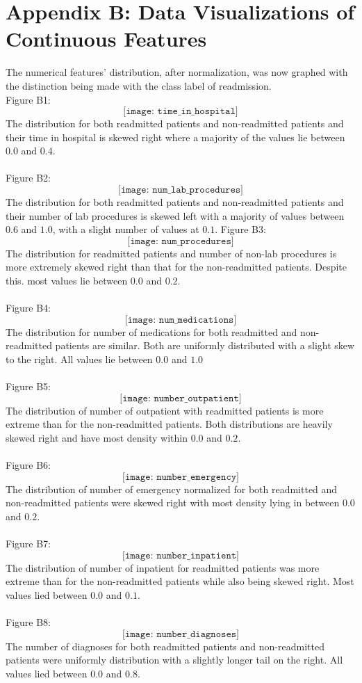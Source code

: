 \documentclass{article}
\begin{document}
\section{Appendix B: Data Visualizations of Continuous Features}
The numerical features' distribution, after normalization, was now graphed with the distinction being made with the class label of readmission. \\
Figure B1: $$ \texttt{[image: time\_in\_hospital]}$$ 
The distribution for both readmitted patients and non-readmitted patients and their time in hospital is skewed right where a majority of the values lie between $0.0$ and $0.4$. \\~\\
Figure B2: $$ \texttt{[image: num\_lab\_procedures]}$$ 
The distribution for both readmitted patients and non-readmitted patients and their number of lab procedures is skewed left with a majority of values between $0.6$ and $1.0$, with a slight number of values at $0.1$. \newpage
Figure B3: $$ \texttt{[image: num\_procedures]}$$ 
The distribution for readmitted patients and number of non-lab procedures is more extremely skewed right than that for the non-readmitted patients. Despite this. most values lie between $0.0$ and $0.2$. \\~\\
Figure B4: $$ \texttt{[image: num\_medications]}$$ 
The distribution for number of medications for both readmitted and non-readmitted patients are similar. Both are uniformly distributed with a slight skew to the right. All values lie between $0.0$ and $1.0$ \\~\\
Figure B5: $$ \texttt{[image: number\_outpatient]}$$ 
The distribution of number of outpatient with readmitted patients is more extreme than for the non-readmitted patients. Both distributions are heavily skewed right and have most density within $0.0$ and $0.2$. \\~\\
Figure B6: $$ \texttt{[image: number\_emergency]}$$ 
The distribution of number of emergency normalized for both readmitted and non-readmitted patients were skewed right with most density lying in between $0.0$ and $0.2$. \\~\\
Figure B7: $$ \texttt{[image: number\_inpatient]}$$ 
The distribution of number of inpatient for readmitted patients was more extreme than for the non-readmitted patients while also being skewed right. Most values lied between $0.0$ and $0.1$. \\~\\
Figure B8: $$ \texttt{[image: number\_diagnoses]}$$ 
The number of diagnoses for both readmitted patients and non-readmitted patients were uniformly distribution with a slightly longer tail on the right. All values lied between $0.0$ and $0.8$. 
\end{document}
